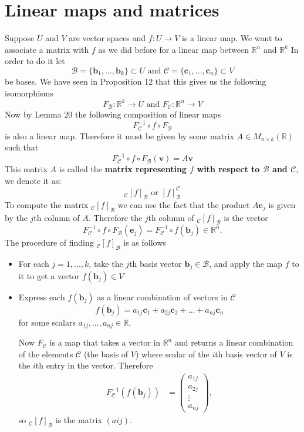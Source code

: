 \documentclass[11pt,a4paper]{article}
\newcommand\R{\mathbb{R}}
\newcommand\Bf{\mathcal{B}}
\newcommand\Cf{\mathcal{C}}
\newcommand\bb{\mathbf{b}}
\newcommand\cb{\mathbf{c}}
\newcommand\eb{\mathbf{e}}
\newcommand\vb{\mathbf{v}}
\theoremstyle{definition}
\begin{document}
\section{Linear maps and matrices}
Suppose $ U $ and $ V $ are vector spaces and $ f : U \to V $ is a linear map. We want to associate a matrix with $ f $ as we did before 
for a linear map between $ \R^n $ and $ \R^k $ In order to do it let 
\[ \Bf = \{\bb_1, ..., \bb_k\} \subset U \text{ and } \Cf = \{\cb_1, ..., \cb_n\} \subset V\]
be bases. We have seen in Proposition 12 that this gives us the following isomorphisms
\[ F_\Bf : \R^k \to U \text{ and } F_\Cf : \R^n \to V\]
Now by Lemma 20 the following composition of linear maps 
\[ F_\Cf^{-1} \circ f \circ F_\Bf \]
is also a linear map. Therefore it must be given by some  matrix $ A \in M_{n \times k} (\R)$ such that
\[ F_\Cf^{-1} \circ f \circ F_\Bf(\vb) = A \vb\]
This matrix $ A $ is called the \textbf{matrix representing $ f $ with respect to $ \Bf $ and $ \Cf $}, we denote it as:
\[ _\Cf[f]_\Bf \text{ or } [f]_{\Bf}^{\Cf}\]
To compute the matrix $_\Cf[f]_\Bf$ we can use the fact that the product $ A \eb_j $ is given by the $j$th column of $ A $.  
Therefore the $j$th column of $_\Cf[f]_\Bf$ is the vector
\[ F_\Cf^{-1} \circ f \circ F_\Bf(\eb_j) = F_\Cf^{-1} \circ f(\bb_j) \in \R^n.\]
The procedure of finding $_\Cf[f]_\Bf$ is as follows
\begin{itemize}
    \item For each $ j = 1, ..., k $, take the $j$th basis vector $ \bb_j \in \Bf $, and apply the map $ f $ to it to get a vector $f(\bb_j) \in V $
    \item Express each $f(\bb_j) $ as a linear combination of vectors in $\Cf$
    \[ f(\bb_j) = a_{1j}\cb_1 + a_{2j}\cb_2 + ... + a_{nj}\cb_n \]
    for some scalars $ a_{1j}, ..., a_{nj} \in \R $.

    Now $F_\Cf$ is a map that takes a vector in $ \R^n $ and returns a linear combination of the elements $\Cf$ (the basis of $V$) where scalar of the $i$th 
    basis vector of $V$ is the $i$th entry in the vector. Therefore 
    \begin{align}
        F_\Cf^{-1}( f(\bb_j)) &= \begin{pmatrix}
           a_{1j} \\
           a_{2j} \\
           \vdots \\
           a_{nj} 
        \end{pmatrix},
    \end{align}
    so $_\Cf[f]_\Bf$ is the matrix $(a{ij})$.
\end{itemize}
\end{document}
